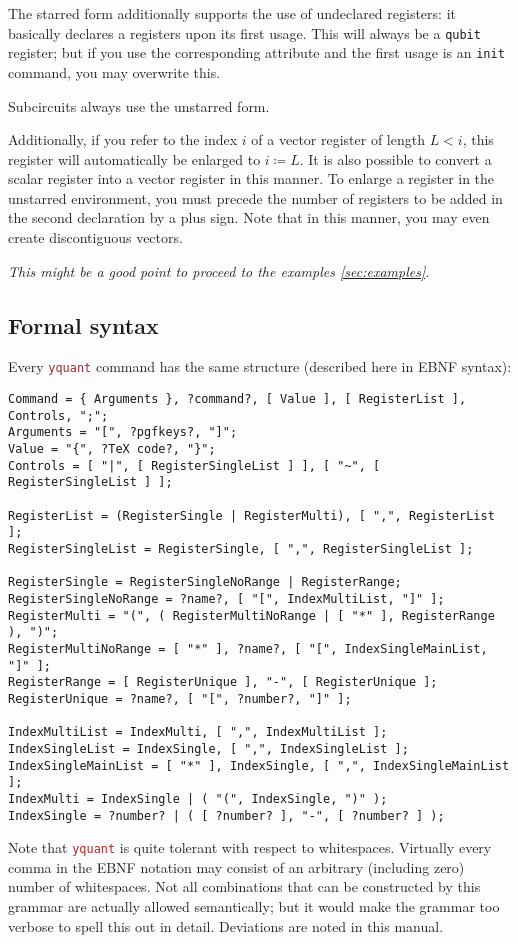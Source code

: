\documentclass{scrartcl}
\def\pkg#1{\textcolor{brown}{\texttt{#1}}}
\def\ttlink{\link\texttt}
\def\Yquant{\pkg{yquant}}
\begin{document}
         The starred form additionally supports the use of undeclared registers: it basically declares a registers upon its first usage.
         This will always be a \ttlink{qubit} register; but if you use the corresponding attribute and the first usage is an \ttlink{init} command, you may overwrite this.

         Subcircuits always use the unstarred form.

         Additionally, if you refer to the index $i$ of a vector register of length $L < i$, this register will automatically be enlarged to $i \coloneq L$.
         It is also possible to convert a scalar register into a vector register in this manner.
         To enlarge a register in the unstarred environment, you must precede the number of registers to be added in the second declaration by a plus sign.
         Note that in this manner, you may even create discontiguous vectors.

         \emph{This might be a good point to proceed to the examples \cref{sec:examples}.}

      \subsection[Formal syntax]{Formal syntax}
         Every \Yquant{} command has the same structure (described here in EBNF syntax):
         \begin{verbatim}
Command = { Arguments }, ?command?, [ Value ], [ RegisterList ], Controls, ";";
Arguments = "[", ?pgfkeys?, "]";
Value = "{", ?TeX code?, "}";
Controls = [ "|", [ RegisterSingleList ] ], [ "~", [ RegisterSingleList ] ];

RegisterList = (RegisterSingle | RegisterMulti), [ ",", RegisterList ];
RegisterSingleList = RegisterSingle, [ ",", RegisterSingleList ];

RegisterSingle = RegisterSingleNoRange | RegisterRange;
RegisterSingleNoRange = ?name?, [ "[", IndexMultiList, "]" ];
RegisterMulti = "(", ( RegisterMultiNoRange | [ "*" ], RegisterRange ), ")";
RegisterMultiNoRange = [ "*" ], ?name?, [ "[", IndexSingleMainList, "]" ];
RegisterRange = [ RegisterUnique ], "-", [ RegisterUnique ];
RegisterUnique = ?name?, [ "[", ?number?, "]" ];

IndexMultiList = IndexMulti, [ ",", IndexMultiList ];
IndexSingleList = IndexSingle, [ ",", IndexSingleList ];
IndexSingleMainList = [ "*" ], IndexSingle, [ ",", IndexSingleMainList ];
IndexMulti = IndexSingle | ( "(", IndexSingle, ")" );
IndexSingle = ?number? | ( [ ?number? ], "-", [ ?number? ] );
         \end{verbatim}
         Note that \Yquant{} is quite tolerant with respect to whitespaces.
         Virtually every comma in the EBNF notation may consist of an arbitrary (including zero) number of whitespaces.
         Not all combinations that can be constructed by this grammar are actually allowed semantically; but it would make the grammar too verbose to spell this out in detail.
         Deviations are noted in this manual.
\end{document}
